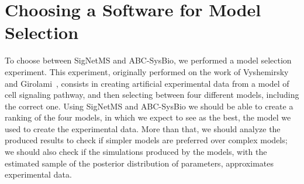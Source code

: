 

\section{Choosing a Software for Model Selection}
%
%  

To choose between SigNetMS and ABC-SysBio, we performed a model
selection experiment. This experiment, originally performed on the work
of Vyshemirsky and Girolami~\cite{Vyshemirsky2007}, consists in creating
artificial experimental data from a model of cell signaling pathway, and 
then selecting between four different models, including the correct one.
Using SigNetMS and ABC-SysBio we should be able to create a ranking of
the four models, in which we expect to see as the best, the model we
used to create the experimental data. More than that, we should analyze
the produced results to check if simpler models are preferred over
complex models; we should also check if the simulations produced by the
models, with the estimated sample of the posterior distribution of
parameters, approximates experimental data.

